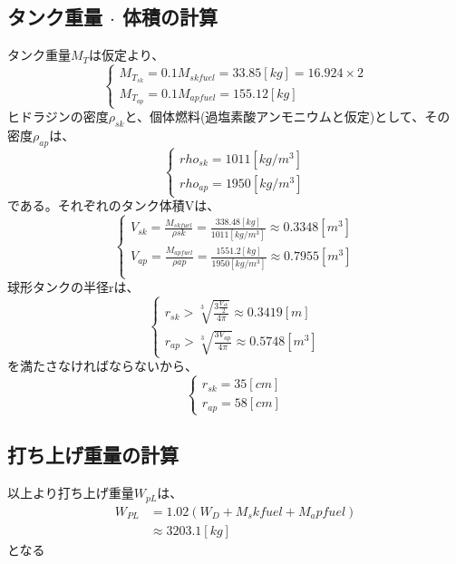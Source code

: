 \subsection{タンク重量 $\cdot$ 体積の計算}
タンク重量$M_T$は仮定より、
\begin{equation}
  \begin{cases}
    M_{T_{sk}} = 0.1M_{skfuel} = 33.85[kg] = 16.924 \times 2 \\
    M_{T_{ap}} = 0.1M_{apfuel} = 155.12[kg]
  \end{cases}
\end{equation}
ヒドラジンの密度$\rho_{sk}$と、個体燃料(過塩素酸アンモニウムと仮定)として、その
密度$\rho_{ap}$は、
\begin{equation}
  \begin{cases}
    rho_{sk} = 1011[kg/m^3] \\
    rho_{ap} = 1950[kg/m^3]
  \end{cases}
\end{equation}
である。それぞれのタンク体積Vは、
\begin{equation}
  \begin{cases}
    V_{sk} = \frac{M_{skfuel}}{\rho sk} = \frac{338.48[kg]}{1011[kg/m^3]}
     \approx 0.3348[m^3] \\
     V_{ap} = \frac{M_{apfuel}}{\rho ap} = \frac{1551.2[kg]}{1950[kg/m^3]}
      \approx 0.7955[m^3] \\
  \end{cases}
\end{equation}
球形タンクの半径rは、
\begin{equation}
  \begin{cases}
    r_{sk} > \sqrt[3]{\frac{3\frac{V_{sk}}{2}}{4\pi}} \approx 0.3419[m] \\
    r_{ap} > \sqrt[3]{\frac{3V_{ap}}{4\pi}} \approx 0.5748[m^3]
  \end{cases}
\end{equation}
を満たさなければならないから、
\begin{equation}
  \begin{cases}
    r_{sk} = 35[cm] \\
    r_{ap} = 58[cm]
  \end{cases}
\end{equation}

\subsection{打ち上げ重量の計算}
以上より打ち上げ重量$W_{pL}$は、
\begin{align*}
  W_{PL} & = 1.02(W_D + M_skfuel + M_apfuel) \\
         & \approx 3203.1[kg]
\end{align*}
となる
